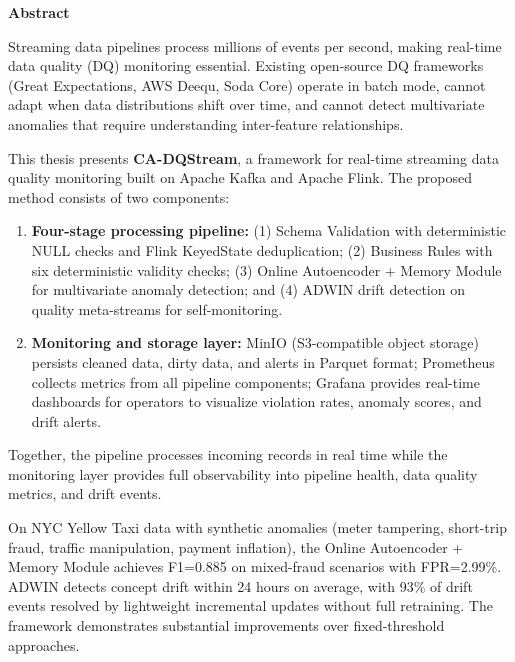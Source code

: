 \documentclass[a4paper, reqno, oneside]{book}
\begin{document}
\vspace{2cm}
{\bf Abstract}
\small
\begin{list}{}{%
  \setlength{\topsep}{0pt}%
  \setlength{\leftmargin}{\parindent}%
  \setlength{\rightmargin}{\parindent}%
}\item[\relax]\ignorespaces

\noindent Streaming data pipelines process millions of events per second, making real-time data quality (DQ) monitoring essential. Existing open-source DQ frameworks (Great Expectations, AWS Deequ, Soda Core) operate in batch mode, cannot adapt when data distributions shift over time, and cannot detect multivariate anomalies that require understanding inter-feature relationships.

This thesis presents \textbf{CA-DQStream}, a framework for real-time streaming data quality monitoring built on Apache Kafka and Apache Flink. The proposed method consists of two components:

\begin{enumerate}
    \item \textbf{Four-stage processing pipeline:} (1) Schema Validation with deterministic NULL checks and Flink KeyedState deduplication; (2) Business Rules with six deterministic validity checks; (3) Online Autoencoder + Memory Module for multivariate anomaly detection; and (4) ADWIN drift detection on quality meta-streams for self-monitoring.
    \item \textbf{Monitoring and storage layer:} MinIO (S3-compatible object storage) persists cleaned data, dirty data, and alerts in Parquet format; Prometheus collects metrics from all pipeline components; Grafana provides real-time dashboards for operators to visualize violation rates, anomaly scores, and drift alerts.
\end{enumerate}

Together, the pipeline processes incoming records in real time while the monitoring layer provides full observability into pipeline health, data quality metrics, and drift events.

On NYC Yellow Taxi data with synthetic anomalies (meter tampering, short-trip fraud, traffic manipulation, payment inflation), the Online Autoencoder + Memory Module achieves F1=0.885 on mixed-fraud scenarios with FPR=2.99\%. ADWIN detects concept drift within 24 hours on average, with 93\% of drift events resolved by lightweight incremental updates without full retraining. The framework demonstrates substantial improvements over fixed-threshold approaches.

\end{list}
\end{document}
